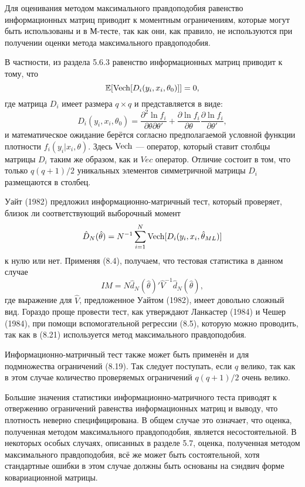 Для оценивания методом максимального правдоподобия равенство информационных матриц приводит к моментным ограничениям, которые могут быть использованы и в М-тесте, так как они, как правило, не используются при получении оценки метода максимального правдоподобия.

В частности, из раздела 5.6.3 равенство информационных матриц приводит к тому, что
\begin{equation}
\mathbb{E}[\mathrm{Vech}[D_i(y_i, x_i, \theta_0)]] = 0,
\end{equation}
где матрица $D_i$ имеет размера $q \times q$ и представляется в виде:
\begin{equation}
D_i(y_i, x_i, \theta_0) = \frac{\partial^{2}{\ln f_i}}{\partial{\theta}\partial{\theta}'} + \frac{\partial{\ln f_i}}{\partial{\theta}} \frac{\partial{\ln f_i}}{\partial{\theta'}},
\end{equation}
и математическое ожидание берётся согласно предполагаемой условной функции плотности $f_i(y_i| x_i, \theta)$. Здесь $\mathrm{Vech}$ --- оператор, который ставит столбцы матрицы $D_i$ таким же образом, как и $Vec$ оператор. Отличие состоит в том, что только $q(q + 1)/2$ уникальных элементов симметричной матрицы $D_i$ размещаются в столбец.

Уайт (1982) предложил информационно-матричный тест, который проверяет, близок ли соответствующий выборочный момент
\begin{equation}
\hat{D}_N(\hat{\theta}) = N^{-1}\sum_{i=1}^N \mathrm{Vech}[D_i(y_i, x_i, \hat{\theta}_{ML})]
\end{equation}
к нулю или нет. Применяя (8.4), получаем, что тестовая статистика в данном случае
\begin{equation}
IM = N\hat{d}_N(\hat{\theta})'\hat{V}^{-1}\hat{d}_N(\hat{\theta}),
\end{equation}
где выражение для $\hat{V}$, предложенное Уайтом (1982), имеет довольно сложный вид. Гораздо проще провести тест, как утверждают Ланкастер (1984) и Чешер (1984), при помощи вспомогательной регрессии (8.5), которую можно проводить, так как в (8.21) используется метод максимального правдоподобия.

Информационно-матричный тест также может быть применён и для подмножества ограничений (8.19). Так следует поступать, если $q$ велико, так как в этом случае количество проверяемых ограничений $q(q + 1)/2$ очень велико.

Большие значения статистики информационно-матричного теста приводят к отвержению ограничений равенства информационных матриц и выводу, что плотность неверно специфицирована. В общем случае это означает, что оценка, полученная методом максимального правдоподобия, является несостоятельной. В некоторых особых случаях, описанных в разделе 5.7, оценка, полученная методом максимального правдоподобия, всё же может быть состоятельной, хотя стандартные ошибки в этом случае должны быть основаны на сэндвич форме ковариационной матрицы.

